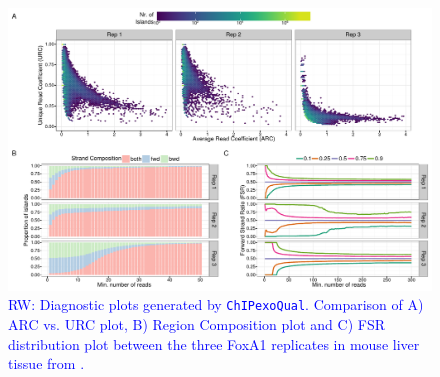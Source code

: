 \documentclass{bmcart}
\newcommand{\pname}[1]{\texttt{ChIPexoQual}}
\newcommand{\RW}[1]{\textcolor{blue}{RW: #1}}
\begin{document}
\newpage


\begin{figure}[h!]
  \centering
    \includegraphics[width = .95\textwidth]{figures/fig3/fig3.pdf}
  \caption{\RW{Diagnostic plots generated by \pname{}. Comparison of
      A) ARC vs. URC plot, B) Region Composition plot and C) FSR
      distribution plot between the three FoxA1 replicates in mouse
      liver tissue from \cite{exoillumina}.}}
  \label{fig:3}
\end{figure}

\newpage




\newpage

\end{document}
